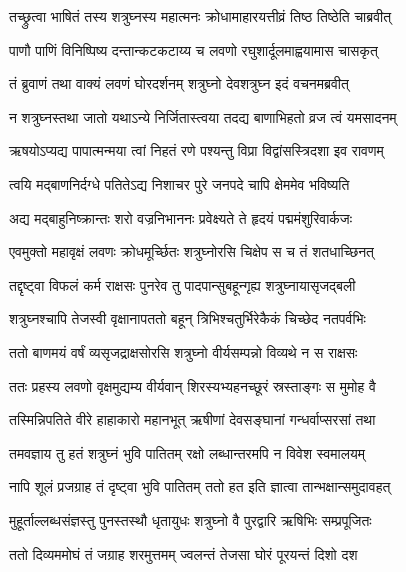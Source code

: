 
\twolineshloka
{तच्छ्रुत्वा भाषितं तस्य शत्रुघ्नस्य महात्मनः}
{क्रोधामाहारयत्तीव्रं तिष्ठ तिष्ठेति चाब्रवीत्} %

\twolineshloka
{पाणौ पाणिं विनिष्पिष्य दन्तान्कटकटाय्य च}
{लवणो रघुशार्दूलमाह्वयामास चासकृत्} %

\twolineshloka
{तं ब्रुवाणं तथा वाक्यं लवणं घोरदर्शनम्}
{शत्रुघ्नो देवशत्रुघ्न इदं वचनमब्रवीत्} %

\twolineshloka
{न शत्रुघ्नस्तथा जातो यथाऽन्ये निर्जितास्त्वया}
{तदद्य बाणाभिहतो व्रज त्वं यमसादनम्} %

\twolineshloka
{ऋषयोऽप्यद्य पापात्मन्मया त्वां निहतं रणे}
{पश्यन्तु विप्रा विद्वांसस्त्रिदशा इव रावणम्} %

\twolineshloka
{त्वयि मद्बाणनिर्दग्धे पतितेऽद्य निशाचर}
{पुरे जनपदे चापि क्षेममेव भविष्यति} %

\twolineshloka
{अद्य मद्बाहुनिष्क्रान्तः शरो वज्रनिभाननः}
{प्रवेक्ष्यते ते हृदयं पद्ममंशुरिवार्कजः} %

\twolineshloka
{एवमुक्तो महावृक्षं लवणः क्रोधमूर्च्छितः}
{शत्रुघ्नोरसि चिक्षेप स च तं शतधाच्छिनत्} %

\twolineshloka
{तद्दृष्ट्वा विफलं कर्म राक्षसः पुनरेव तु}
{पादपान्सुबहून्गृह्य शत्रुघ्नायासृजद्बली} %

\twolineshloka
{शत्रुघ्नश्चापि तेजस्वी वृक्षानापततो बहून्}
{त्रिभिश्चतुर्भिरेकैकं चिच्छेद नतपर्वभिः} %

\twolineshloka
{ततो बाणमयं वर्षं व्यसृजद्राक्षसोरसि}
{शत्रुघ्नो वीर्यसम्पन्नो विव्यथे न स राक्षसः} %

\twolineshloka
{ततः प्रहस्य लवणो वृक्षमुद्यम्य वीर्यवान्}
{शिरस्यभ्यहनच्छूरं स्रस्ताङ्गः स मुमोह वै} %

\twolineshloka
{तस्मिन्निपतिते वीरे हाहाकारो महानभूत्}
{ऋषीणां देवसङ्घानां गन्धर्वाप्सरसां तथा} %

\twolineshloka
{तमवज्ञाय तु हतं शत्रुघ्नं भुवि पातितम्}
{रक्षो लब्धान्तरमपि न विवेश स्वमालयम्} %

\twolineshloka
{नापि शूलं प्रजग्राह तं दृष्ट्वा भुवि पातितम्}
{ततो हत इति ज्ञात्वा तान्भक्षान्समुदावहत्} %

\twolineshloka
{मुहूर्ताल्लब्धसंज्ञस्तु पुनस्तस्थौ धृतायुधः}
{शत्रुघ्नो वै पुरद्वारि ऋषिभिः सम्प्रपूजितः} %

\twolineshloka
{ततो दिव्यममोघं तं जग्राह शरमुत्तमम्}
{ज्वलन्तं तेजसा घोरं पूरयन्तं दिशो दश} %

